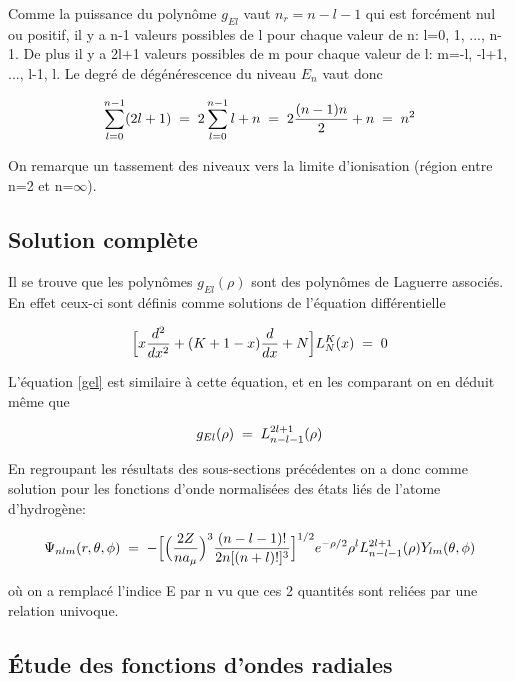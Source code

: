 Comme la puissance du polynôme $g_{El}$ vaut $n_r=n-l-1$ qui est forcément nul ou positif, il y a n-1 valeurs possibles de l pour chaque valeur de n: l=0, 1, ..., n-1. De plus il y a 2l+1 valeurs possibles de m pour chaque valeur de l: m=-l, -l+1, ..., l-1, l. Le degré de dégénérescence du niveau $E_n$ vaut donc

\begin{equation*}
    \sum_{l=0}^{n-1} (2l+1)\; = \; 2\sum_{l=0}^{n-1} l + n \; = \;  2 \dfrac{(n-1)n}{2} + n \; = \;  n^2
\end{equation*}

On remarque un tassement des niveaux vers la limite d'ionisation (région entre n=2 et n=$\infty$).

\subsection{Solution complète}

Il se trouve que les polynômes $g_{El}(\rho)$ sont des polynômes de Laguerre associés. En effet ceux-ci sont définis comme solutions de l'équation différentielle

\begin{equation}
    \Big[x\dfrac{d^2}{dx^2}+(K+1-x)\dfrac{d}{dx}+N\Big] L_{N}^{K}(x)\; = \; 0
\end{equation}

L'équation \eqref{gel} est similaire à cette équation, et en les comparant on en déduit même que

\begin{equation*}
    g_{El}(\rho)\; = \; L_{n-l-1}^{2l+1}(\rho)
\end{equation*}

En regroupant les résultats des sous-sections précédentes on a donc comme solution pour les fonctions d'onde normalisées des états liés de l'atome d'hydrogène:

\begin{equation}
    \Psi_{nlm}(r,\theta,\phi)\; = \; -\Big[\Big(\dfrac{2Z}{na_{\mu}}\Big)^3\dfrac{(n-l-1)!}{2n[(n+l)!]^3}\Big]^{1/2}e^{-\rho/2}\rho^l L_{n-l-1}^{2l+1}(\rho)Y_{lm}(\theta,\phi)
    \label{sol}
\end{equation}

où on a remplacé l'indice E par n vu que ces 2 quantités sont reliées par une relation univoque. 

\subsection{Étude des fonctions d'ondes radiales}

